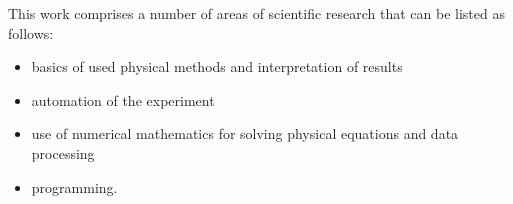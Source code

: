 \iffalse
\par
Vlastná práca zahŕňa v sebe viacero oblastí vedecko-výskumnej
činnosti, ktoré možno následovne vyčleniť:
\begin{itemize}
\item{fyzikálne základy použitých metód a interpretácia výsledkov}
\item{automatizácia experimentu}
\item{použitie numerickej  matematiky pre riešenie fyzikálnych rovníc a spracovanie dát}
\item{tvorba programového vybavenia} .
\end{itemize}
\fi
\par This work comprises a number of areas of scientific research that
can be listed as follows:
\begin{itemize}
\item{basics of used physical methods and interpretation of results}
\item{automation of the experiment}
\item{use of numerical mathematics for solving physical equations and data processing}
\item{programming}.
\end{itemize}

